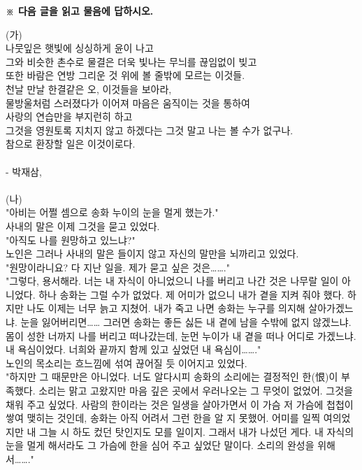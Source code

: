 \documentclass[10pt,a4paper]{article}
\begin{document}
\vspace{4mm}
{\small\textbf{※ 다음 글을 읽고 물음에 답하시오.}}
\vspace{2mm}
\begin{tcolorbox}[passage]
(가) \\{}
나뭇잎은 햇빛에 싱싱하게 윤이 나고 \\{}
그와 비슷한 촌수로 물결은 더욱 빛나는 무늬를 끊임없이 빚고 \\{}
또한 바람은 연방 그리운 것 위에 볼 줄밖에 모르는 이것들. \\{}
천날 만날 한결같은 오, 이것들을 보아라, \\{}
물방울처럼 스러졌다가 이어져 마음은 움직이는 것을 통하여 \\{}
사랑의 연습만을 부지런히 하고 \\{}
그것을 영원토록 지치지 않고 하겠다는 그것 말고 나는 볼 수가 없구나. \\{}
참으로 환장할 일은 이것이로다. \\{}
\vspace{4pt} \\{}
- 박재삼,  \\{}
\vspace{4pt} \\{}
(나) \\{}
"아비는 어쩔 셈으로 송화 누이의 눈을 멀게 했는가." \\{}
사내의 말은 이제 그것을 묻고 있었다. \\{}
"아직도 나를 원망하고 있느냐?" \\{}
노인은 그러나 사내의 말은 들이지 않고 자신의 말만을 뇌까리고 있었다. \\{}
"원망이라니요? 다 지난 일을. 제가 묻고 싶은 것은……." \\{}
"그렇다, 용서해라. 너는 내 자식이 아니었으니 나를 버리고 나간 것은 나무랄 일이 아니었다. 하나 송화는 그럴 수가 없었다. 제 어미가 없으니 내가 곁을 지켜 줘야 했다. 하지만 나도 이제는 너무 늙고 지쳤어. 내가 죽고 나면 송화는 누구를 의지해 살아가겠느냐. 눈을 잃어버리면…… 그러면 송화는 좋든 싫든 내 곁에 남을 수밖에 없지 않겠느냐. 몸이 성한 너까지 나를 버리고 떠나갔는데, 눈먼 누이가 내 곁을 떠나 어디로 가겠느냐. 내 욕심이었다. 너희와 끝까지 함께 있고 싶었던 내 욕심이……." \\{}
노인의 목소리는 흐느낌에 섞여 끊어질 듯 이어지고 있었다. \\{}
"하지만 그 때문만은 아니었다. 너도 알다시피 송화의 소리에는 결정적인 한(恨)이 부족했다. 소리는 맑고 고왔지만 마음 깊은 곳에서 우러나오는 그 무엇이 없었어. 그것을 채워 주고 싶었다. 사람의 한이라는 것은 일생을 살아가면서 이 가슴 저 가슴에 첩첩이 쌓여 맺히는 것인데, 송화는 아직 어려서 그런 한을 알 지 못했어. 어미를 일찍 여의었지만 내 그늘 시 하도 컸던 탓인지도 모를 일이지. 그래서 내가 나섰던 게다. 내 자식의 눈을 멀게 해서라도 그 가슴에 한을 심어 주고 싶었단 말이다. 소리의 완성을 위해서……." \\{}

\end{tcolorbox}
\end{document}
